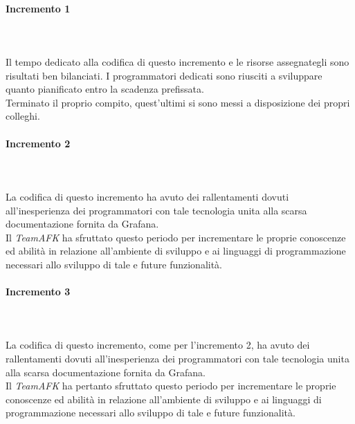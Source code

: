 \paragraph*{Incremento 1} \mbox{} \\ \mbox{} \\
Il tempo dedicato alla codifica di questo incremento e le risorse assegnategli sono risultati ben bilanciati. I programmatori dedicati sono riusciti a sviluppare quanto pianificato entro la scadenza prefissata. \\ 
Terminato il proprio compito, quest'ultimi si sono messi a disposizione dei propri colleghi.

\paragraph*{Incremento 2} \mbox{} \\ \mbox{} \\
La codifica di questo incremento ha avuto dei rallentamenti dovuti all'inesperienza dei programmatori con tale tecnologia unita alla scarsa documentazione fornita da Grafana. \\ Il \textit{TeamAFK} ha sfruttato questo periodo per incrementare le proprie conoscenze ed abilità in relazione all'ambiente di sviluppo e ai linguaggi di programmazione necessari allo sviluppo di tale e future funzionalità. 

\paragraph*{Incremento 3} \mbox{} \\ \mbox{} \\
La codifica di questo incremento, come per l'incremento 2, ha avuto dei rallentamenti dovuti all'inesperienza dei programmatori con tale tecnologia unita alla scarsa documentazione fornita da Grafana. \\ 
Il \textit{TeamAFK} ha pertanto sfruttato questo periodo per incrementare le proprie conoscenze ed abilità in relazione all'ambiente di sviluppo e ai linguaggi di programmazione necessari allo sviluppo di tale e future funzionalità.

